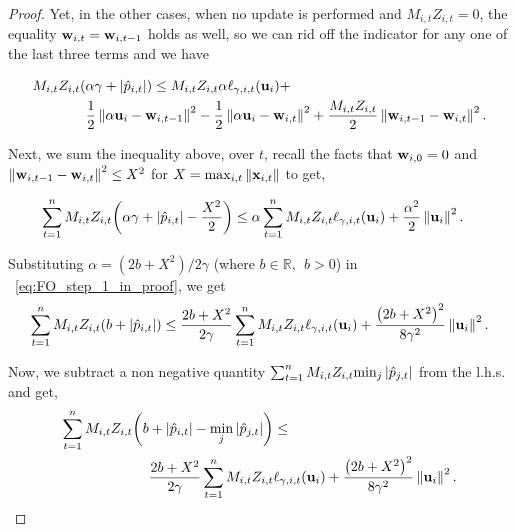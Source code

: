{\begin{proof}
 \noindent
Yet, in the other cases,  when no update is performed and  $M_{i,t}Z_{i,t}=0$,
the equality $\mathbf{w}_{i,t}=\mathbf{w}_{i,t-1}$ holds as well, so we can rid off the indicator for any one of the last three 
terms and we have

\begin{equation*}
\begin{split}
M_{i,t}Z_{i,t}{\left({\alpha\gamma +\left\vert{\hat{p}_{i,t}}\right\vert}\right)} \le M_{i,t}&Z_{i,t}\alpha \ell_{\gamma,i,t}(\mathbf{u}_i)+\\ 
\frac{1}{2}\left\Vert {\alpha \mathbf{u}_i-\mathbf{w}_{i,t-1}} \right\Vert^2&-\frac{1}{2}\left\Vert {\alpha \mathbf{u}_i-\mathbf{w}_{i,t}} \right\Vert^2+
\frac{M_{i,t}Z_{i,t}}{2}\left\Vert {\mathbf{w}_{i,t-1}-\mathbf{w}_{i,t}} \right\Vert^2.
\end{split}
\end{equation*}

\noindent
Next, we sum the inequality above, over $t$,  recall the facts that
$\mathbf{w}_{i,0}=0$ and $\left\Vert {\mathbf{w}_{i,t-1}-\mathbf{w}_{i,t}} \right\Vert^2\le X^2$ for $X=\max_{i,t}\Vert\mathbf{x}_{i,t}\Vert$ to get,

\begin{equation}
\begin{split}
\sum_{t=1}^{n}{M_{i,t}Z_{i,t}{\left({\alpha\gamma+\left\vert{\hat{p}_{i,t}}\right\vert-\frac{X^2}{2}}\right)}}
\le\alpha\sum_{t=1}^{n}{ M_{i,t}Z_{i,t}
  \ell_{\gamma,i,t}(\mathbf{u}_i)}&+\frac{\alpha^2}{2}\left\Vert {\mathbf{u}_i} \right\Vert^2.
\end{split}
\label{eq:FO_step_1_in_proof}
\end{equation}

\noindent
Substituting $\alpha=(2b+X^2)/2\gamma$ (where $b\in\mathbb{R},~~b>0$)
in ~\eqref{eq:FO_step_1_in_proof}, we get
\begin{equation*}
\begin{split}
\sum_{t=1}^{n}{M_{i,t}Z_{i,t}{\left({b +\left\vert{\hat{p}_{i,t}}\right\vert}\right)}}
\le \frac{2b+X^2}{2\gamma}\sum_{t=1}^{n}{ M_{i,t}Z_{i,t}\ell_{\gamma,i,t}(\mathbf{u}_i)}
+\frac{\left({2b+X^2}\right)^2}{8{\gamma}^2}\left\Vert {\mathbf{u}_i} \right\Vert^2.
\end{split}
\end{equation*} 

\noindent
Now, we subtract a non negative quantity $\sum_{t=1}^{n}M_{i,t}Z_{i,t}
{{\min_j{\left\vert{\hat{p}_{j,t}}\right\vert}}}$ from the l.h.s. and get,
\begin{equation}
\begin{split}
\sum_{t=1}^{n}M_{i,t}Z_{i,t}{\left({b +\left\vert{\hat{p}_{i,t}}\right\vert-\min_j{\left\vert{\hat{p}_{j,t}}\right\vert}}\right)}&\le\\
\frac{2b+X^2}{2\gamma}\sum_{t=1}^{n}{ M_{i,t}Z_{i,t}}&\ell_{\gamma,i,t}(\mathbf{u}_i)
+\frac{\left({2b+X^2}\right)^2}{8{\gamma}^2}\left\Vert {\mathbf{u}_i} \right\Vert^2.
\label{eq:FO_step_2_in_proof}
\end{split}
\end{equation}


\end{proof}}
